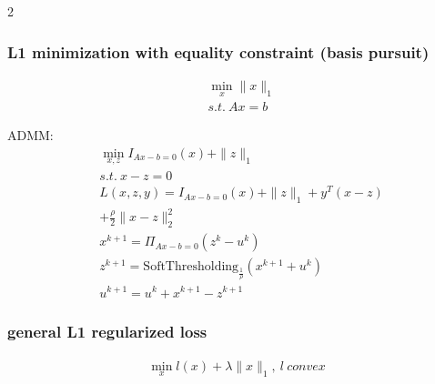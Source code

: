 \documentclass[8pt]{extarticle}
\newcommand{\norm}[1]{\|#1\|}
\begin{document}
\begin{multicols*}{2}
  \subsubsection{L1 minimization with equality constraint (basis pursuit)}
  \begin{align*}
    &\min_x \norm{x}_1\\
    &s.t.\ Ax=b
  \end{align*}

  ADMM:
  \begin{align*}
    &\min_{x,z} I_{Ax-b=0}(x) + \norm{z}_1\\
    &s.t.\ x - z = 0\\
    &L(x,z,y) = I_{Ax-b=0}(x) + \norm{z}_1 + y^T(x-z)\\
    &+ \frac{\rho}{2}\norm{x-z}_2^2\\
    &x^{k+1} = \Pi_{Ax-b=0}(z^k-u^k)\\
    &z^{k+1} = \text{SoftThresholding}_{\frac{1}{\rho}}(x^{k+1}+u^k)\\
    &u^{k+1} = u^k + x^{k+1} - z^{k+1}
  \end{align*}
  
  \vfill\null
  \columnbreak

  \subsubsection{general L1 regularized loss}
  \begin{align*}
    \min_x l(x) + \lambda \norm{x}_1,\ l\ convex
  \end{align*}


\end{multicols*}
\end{document}
